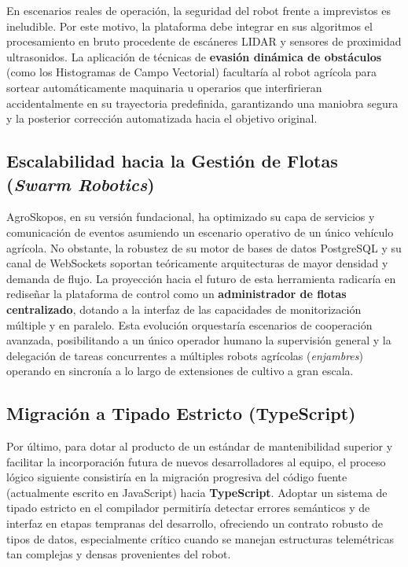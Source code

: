 En escenarios reales de operación, la seguridad del robot frente a imprevistos es ineludible. Por este motivo, la plataforma debe integrar en sus algoritmos el procesamiento en bruto procedente de escáneres LIDAR y sensores de proximidad ultrasonidos. La aplicación de técnicas de \textbf{evasión dinámica de obstáculos} (como los Histogramas de Campo Vectorial) facultaría al robot agrícola para sortear automáticamente maquinaria u operarios que interfirieran accidentalmente en su trayectoria predefinida, garantizando una maniobra segura y la posterior corrección automatizada hacia el objetivo original.

\subsection{Escalabilidad hacia la Gestión de Flotas (\textit{Swarm Robotics})}

AgroSkopos, en su versión fundacional, ha optimizado su capa de servicios y comunicación de eventos asumiendo un escenario operativo de un único vehículo agrícola. No obstante, la robustez de su motor de bases de datos PostgreSQL \cite{postgresql} y su canal de WebSockets soportan teóricamente arquitecturas de mayor densidad y demanda de flujo. La proyección hacia el futuro de esta herramienta radicaría en rediseñar la plataforma de control como un \textbf{administrador de flotas centralizado}, dotando a la interfaz de las capacidades de monitorización múltiple y en paralelo. Esta evolución orquestaría escenarios de cooperación avanzada, posibilitando a un único operador humano la supervisión general y la delegación de tareas concurrentes a múltiples robots agrícolas (\textit{enjambres}) operando en sincronía a lo largo de extensiones de cultivo a gran escala.

\subsection{Migración a Tipado Estricto (TypeScript)}

Por último, para dotar al producto de un estándar de mantenibilidad superior y facilitar la incorporación futura de nuevos desarrolladores al equipo, el proceso lógico siguiente consistiría en la migración progresiva del código fuente (actualmente escrito en JavaScript) hacia \textbf{TypeScript}. Adoptar un sistema de tipado estricto en el compilador permitiría detectar errores semánticos y de interfaz en etapas tempranas del desarrollo, ofreciendo un contrato robusto de tipos de datos, especialmente crítico cuando se manejan estructuras telemétricas tan complejas y densas provenientes del robot.
